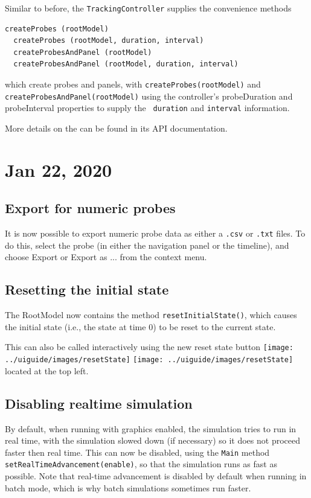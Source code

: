 \documentclass{article}
\begin{document}
Similar to before, the {\tt TrackingController} supplies the
convenience methods
%
\begin{lstlisting}[]
  createProbes (rootModel)
  createProbes (rootModel, duration, interval)
  createProbesAndPanel (rootModel)
  createProbesAndPanel (rootModel, duration, interval)
\end{lstlisting}
%
which create probes and panels, with {\tt createProbes(rootModel)} and
{\tt createProbesAndPanel(rootModel)} using the controller's {\sf
probeDuration} and {\sf probeInterval} properties to supply the {\tt
duration} and {\tt interval} information.

More details on the 
can be found in its API documentation.

\section*{Jan 22, 2020}

\subsection*{Export for numeric probes}

It is now possible to export numeric probe data as either a {\tt .csv}
or {\tt .txt} files. To do this, select the probe (in either the
navigation panel or the timeline), and choose {\sf Export} or {\sf
Export as ...} from the context menu.

\subsection*{Resetting the initial state}

The RootModel now contains the method {\tt resetInitialState()}, which
causes the initial state (i.e., the state at time 0) to be reset to
the current state.

This can also be called interactively using the new {\sf reset state}
button 
\iflatexml
\texttt{[image: ../uiguide/images/resetState]} 
\else
\texttt{[image: ../uiguide/images/resetState]} 
\fi
located at the top left.

\subsection*{Disabling realtime simulation}

By default, when running with graphics enabled, the simulation tries
to run in real time, with the simulation slowed down (if necessary) so
it does not proceed faster then real time. This can now be disabled,
using the {\tt Main} method {\tt setRealTimeAdvancement(enable)}, so
that the simulation runs as fast as possible. Note that real-time
advancement is disabled by default when running in batch mode, which
is why batch simulations sometimes run faster.
\end{document}
